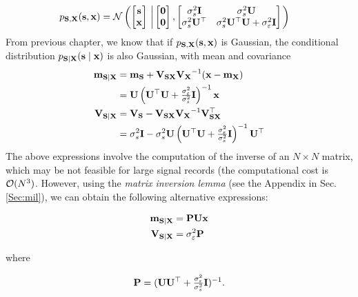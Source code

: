 \begin{align}
p_{{\bf S},{\bf X}}({\mathbf s},{\mathbf x}) 
	&= {\mathcal N}\left(
	      \begin{bmatrix} {\mathbf s} \\ {\mathbf x} \end{bmatrix}
          \, \left| \,	                
	      \begin{bmatrix} {\bf 0} \\ {\bf 0} \end{bmatrix},
          \begin{bmatrix} \sigma_s^2{\mathbf I}     & \sigma_s^2{\mathbf U} \\ 
                          \sigma_s^2{\mathbf U}^\top & \sigma_s^2{\mathbf U}^\top{\mathbf U} + 
                                               \sigma_\varepsilon^2 {\mathbf I}
          \end{bmatrix}
          \right.
          \right)
\label{eq:jointsx}
\end{align}
From previous chapter, we know that if $p_{{\bf S},{\bf X}}({\mathbf s},{\mathbf x}) $ is Gaussian, the conditional distribution $p_{{\bf S}|{\bf X}}({\mathbf s} \mid {\mathbf x}) $ is also Gaussian, with mean and covariance
\begin{align}
\label{Filt:msx}
{\bf m}_{{\bf S}|{\bf X}} 
      &= {\bf m}_{\bf S} + {\bf V}_{\bf SX}{\bf V_X}^{-1}({\bf x}-{\bf m}_{\bf X})    \nonumber \\
      &= {\mathbf U} \left({\mathbf U}^\top{\mathbf U} + \tfrac{\sigma_\varepsilon^2}{\sigma_s^2} {\mathbf I} \right)^{-1}{\mathbf x} \\
\label{Filt:vsx}
{\bf V}_{{\bf S}|{\bf X}} 
      &= {\bf V_S}- {\bf V}_{\bf SX}{\bf V_X}^{-1}{\bf V}_{\bf SX}^\top                \nonumber\\
      &= \sigma_s^2{\mathbf I} 
       - \sigma_s^2{\mathbf U} 
         \left({\mathbf U}^\top {\mathbf U} + \tfrac{\sigma_\varepsilon^2}{\sigma_s^2}{\mathbf I}\right)^{-1} {\mathbf U}^\top   
\end{align}
The above expressions involve the computation of the inverse of an $N\times N$ matrix, which may be not feasible for large signal records (the computational cost is ${\mathcal O} (N^3)$. However, using the {\em matrix inversion lemma} (see the Appendix in Sec. \ref{Sec:mil}), we can obtain the following alternative expressions:
\begin{framed}\begin{align}
\label{Filt:sMMSEgaussMN2}
{\bf m}_{{\bf S}|{\bf X}} &= {\mathbf P} {\mathbf U} {\mathbf x}         \\
{\bf V}_{{\bf S}|{\bf X}} &= \sigma_\varepsilon^2 {\mathbf P}   
\end{align}\end{framed}
where
\begin{framed}
\begin{equation}
\label{Filt:Pdef}
{\mathbf P} = ({\mathbf U}{\mathbf U}^\top  + \tfrac{\sigma_\varepsilon^2}{\sigma_s^2}{\mathbf I})^{-1}.
\end{equation}
\end{framed}

